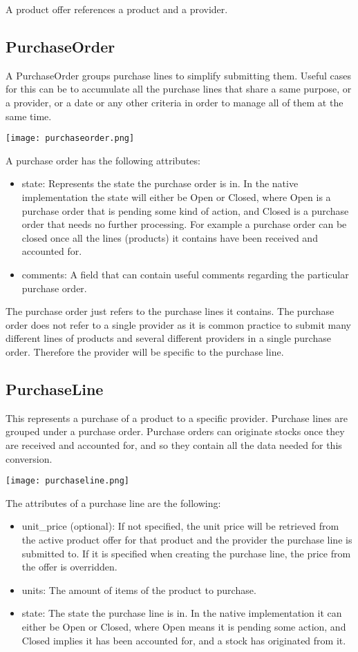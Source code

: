 A product offer references a product and a provider.

\subsection{PurchaseOrder}
A PurchaseOrder groups purchase lines to simplify submitting them. Useful cases for this can be to accumulate all the purchase lines that share a same purpose, or a provider, or a date or any other criteria in order to manage all of them at the same time.
\begin{center}
\texttt{[image: purchaseorder.png]}
\end{center}
A purchase order has the following attributes:

\begin{itemize}
\item state: Represents the state the purchase order is in. In the native implementation the state will either be Open or Closed, where Open is a purchase order that is pending some kind of action, and Closed is a purchase order that needs no further processing. For example a purchase order can be closed once all the lines (products) it contains have been received and accounted for.
\item comments: A field that can contain useful comments regarding the particular purchase order.
\end{itemize}

The purchase order just refers to the purchase lines it contains. The purchase order does not refer to a single provider as it is common practice to submit many different lines of products and several different providers in a single purchase order. Therefore the provider will be specific to the purchase line.

\subsection{PurchaseLine}
This represents a purchase of a product to a specific provider. Purchase lines are grouped under a purchase order. Purchase orders can originate stocks once they are received and accounted for, and so they contain all the data needed for this conversion.
\begin{center}
\texttt{[image: purchaseline.png]}
\end{center}
The attributes of a purchase line are the following:

\begin{itemize}
\item unit\_price (optional): If not specified, the unit price will be retrieved from the active product offer for that product and the provider the purchase line is submitted to. If it is specified when creating the purchase line, the price from the offer is overridden.
\item units: The amount of items of the product to purchase.
\item state: The state the purchase line is in. In the native implementation it can either be Open or Closed, where Open means it is pending some action, and Closed implies it has been accounted for, and a stock has originated from it.
\end{itemize}

